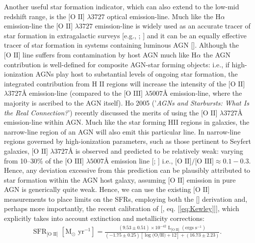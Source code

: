Another useful star formation indicator, which can also extend to the low-mid redshift range, is the $\text{[O II]}$ $\lambda{3727}$ optical emission-line. Much like the $\text{H}\alpha$ emission-line the $\text{[O II]}$ $\lambda{3727}$ emission-line is widely used as an accurate tracer of star formation in extragalactic surveys [e.g., \cite{Lilly_1996}; \cite{Hippelein_2003}] and it can be an equally effective tracer of star formation in systems containing luminous AGN [\cite{2006ApJ...642..702K}]. Although the $\text{[O II]}$ line suffers from contamination by host AGN much like $\text{H}\alpha$ the AGN contribution is well-defined for composite AGN-star forming objects: i.e., if high-ionization AGNs play host to substantial levels of ongoing star formation, the integrated contribution from $\text{H II}$ regions will increase the intensity of the $\text{[O II]}$ $\lambda3727$Å  emission-line (compared to the $\text{[O III]}$ $\lambda5007$Å emission-line, where the majority is ascribed to the AGN itself). Ho 2005 ('\textit{AGNs and Starbursts: What Is the Real Connection?}') recently discussed the merits of using the $\text{[O II]}$ $\lambda{3727}$Å emission-line within AGN. Much like the star forming HII regions in galaxies, the narrow-line region of an AGN will also emit this particular line. In narrow-line regions governed by high-ionization parameters, such as those pertinent to Seyfert galaxies, $\text{[O II]}$ $\lambda{3727}$Å is observed and predicted to be relatively weak: varying from 10--30\% of the $\text{[O III]}$ $\lambda{5007}$Å emission line [\cite{Ferland_1986}; \cite{Ho_1993}] i.e., $\text{[O II]/[O III]}\approx{0.1-0.3}$. Hence, any deviation excessive from this prediction can be plausibly attributed to star formation within the AGN host galaxy, assuming $\text{[O II]}$ emission in pure AGN is generically quite weak. Hence, we can use the existing $\text{[O II]}$ measurements to place limits on the SFRs, employing both the [\cite{Kennicutt_1998}] derivation and, perhaps more importantly, the recent calibration of [\cite{Kewley_2004}, eq. [\ref{eq:Kewley}]], which explicitly takes into account extinction and metallicity corrections:
\\
\begin{equation}
\begin{align}
\label{eq:Kewley}
{\text{SFR}}_{\text{[O II]}}\,\,[\text{M}_\odot \text{ yr}^{-1}]=\frac{(9.53\pm{0.51})\times10^{-42}\,\,\text{L}_{\text{[O II]}}\,\,(\text{ergs }\text{s}^{-1})}{(-1.75\pm{0.25})[\log{\text{(O/H)}}+12]+(16.73\pm{2.23})}.
\end{align}
\end{equation}
\\
